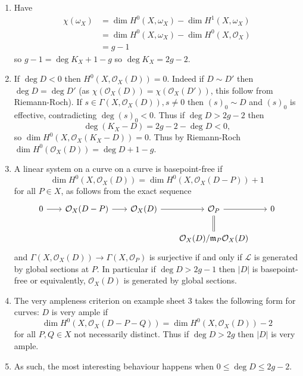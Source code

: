 \documentclass[a4paper]{article}
\newcommand{\sh}[1]{\mathcal{#1}} %
\begin{document}
\begin{remark}\leavevmode
  \begin{enumerate}
  \item Have
    \begin{align*}
      \chi(\omega_X)
      &= \dim H^0(X, \omega_X) - \dim H^1(X, \omega_X) \\
      &= \dim H^0(X, \omega_X) - \dim H^0(X, \sh O_X) \\
      &= g - 1
    \end{align*}
    so \(g - 1 = \deg K_X + 1 - g\) so \(\deg K_X = 2g - 2\).
  \item If \(\deg D < 0\) then \(H^0(X, \sh O_X(D)) = 0\). Indeed if \(D \sim D'\) then \(\deg D = \deg D'\) (as \(\chi(\sh O_X(D)) = \chi(\sh O_X(D'))\), this follow from Riemann-Roch). If \(s \in \Gamma(X, \sh O_X(D)), s \ne 0\) then \((s)_0 \sim D\) and \((s)_0\) is effective, contradicting \(\deg (s)_0 < 0\). Thus if \(\deg D > 2g - 2\) then
    \[
      \deg (K_X - D) = 2g - 2 - \deg D < 0,
    \]
    so \(\dim H^0(X, \sh O_X(K_X - D)) = 0\). Thus by Riemann-Roch \(\dim H^0(\sh O_X(D)) = \deg D + 1 - g\).
  \item A linear system on a curve on a curve is basepoint-free if
    \[
      \dim H^0(X, \sh O_X(D)) = \dim H^0(X, \sh O_X(D - P)) + 1
    \]
    for all \(P \in X\), as follows from the exact sequence
    \[
      \begin{tikzcd}[column sep=scriptsize]
        0 \ar[r] & \sh O_X(D - P) \ar[r] & \sh O_X(D) \ar[r] & \sh O_P \ar[r] \ar[d, equal] & 0 \\
        & & & \sh O_X(D)/\mathfrak m_P \sh O_X(D)
      \end{tikzcd}
    \]
    and \(\Gamma(X, \sh O_X(D)) \to \Gamma(X, \sh O_P)\) is surjective if and only if \(\sh L\) is generated by global sections at \(P\). In particular if \(\deg D > 2g - 1\) then \(|D|\) is basepoint-free or equivalently, \(\sh O_X(D)\) is generated by global sections.
  \item The very ampleness criterion on example sheet 3 takes the following form for curves: \(D\) is very ample if
    \[
      \dim H^0(X, \sh O_X(D - P - Q)) = \dim H^0(X, \sh O_X(D)) - 2
    \]
    for all \(P, Q \in X\) not necessarily distinct. Thus if \(\deg D > 2g\) then \(|D|\) is very ample.
  \item As such, the most interesting behaviour happens when \(0 \leq \deg D \leq 2g - 2\).
  \end{enumerate}
\end{remark}
\end{document}
